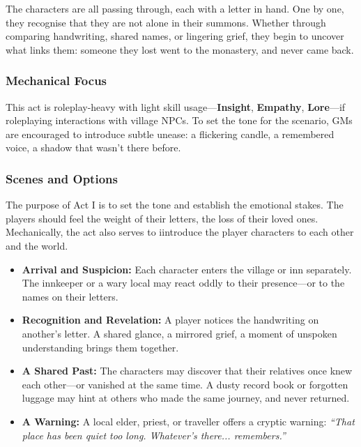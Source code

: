 \documentclass[nodeprecatedcode,bg=print]{dndbook/dndbook}
\begin{document}
The characters are all passing through, each with a letter in hand. One by one, they recognise that they are not alone in their summons. Whether through comparing handwriting, shared names, or lingering grief, they begin to uncover what links them: someone they lost went to the monastery, and never came back.

\subsubsection{Mechanical Focus} This act is roleplay-heavy with light skill usage---\textbf{Insight}, \textbf{Empathy}, \textbf{Lore}---if roleplaying interactions with village NPCs. To set the tone for the scenario, GMs are encouraged to introduce subtle unease: a flickering candle, a remembered voice, a shadow that wasn’t there before.


\subsubsection{Scenes and Options}

The purpose of Act I is to set the tone and establish the emotional stakes. The players should feel the weight of their letters, the loss of their loved ones. Mechanically, the act also serves to iintroduce the player characters to each other and the world.

\begin{WyrdExample}
\begin{itemize}
    \item \textbf{Arrival and Suspicion:} Each character enters the village or inn separately. The innkeeper or a wary local may react oddly to their presence—or to the names on their letters.
    
    \item \textbf{Recognition and Revelation:} A player notices the handwriting on another’s letter. A shared glance, a mirrored grief, a moment of unspoken understanding brings them together.
    
    \item \textbf{A Shared Past:} The characters may discover that their relatives once knew each other—or vanished at the same time. A dusty record book or forgotten luggage may hint at others who made the same journey, and never returned.
    
    \item \textbf{A Warning:} A local elder, priest, or traveller offers a cryptic warning: \emph{“That place has been quiet too long. Whatever’s there... remembers.”}
\end{itemize}
\end{WyrdExample}
\end{document}
